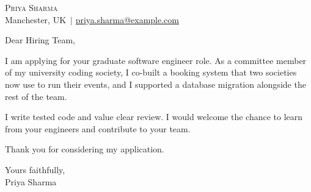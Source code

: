 \documentclass[11pt,a4paper]{article}
\makeatletter
\newcommand{\myname}{Priya Sharma}
\newcommand{\mycity}{Manchester, UK}
\newcommand{\myemail}{priya.sharma@example.com}
\makeatother
\begin{document}
\begin{center}
    {\LARGE\scshape \myname}\\[4pt]
    \mycity\ $\vert$ \href{mailto:\myemail}{\myemail}
\end{center}
\vspace{4pt}

Dear Hiring Team,

I am applying for your graduate software engineer role. As a committee member of my university
coding society, I co-built a booking system that two societies now use to run their events, and
I supported a database migration alongside the rest of the team.

I write tested code and value clear review. I would welcome the chance to learn from your
engineers and contribute to your team.

Thank you for considering my application.

Yours faithfully,\\
Priya Sharma
\end{document}

